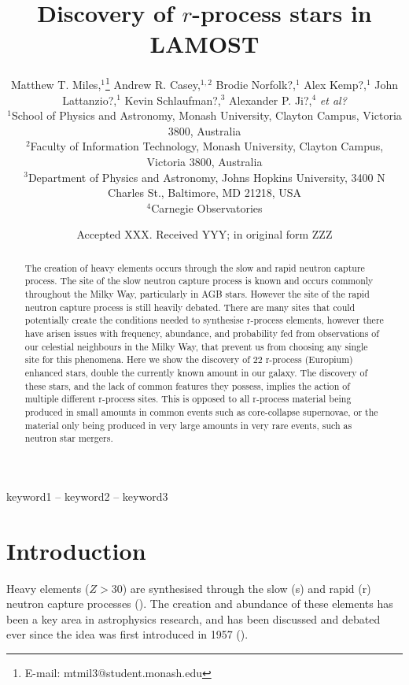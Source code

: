 \documentclass[a4paper,fleqn,usenatbib]{mnras}
\title[Discovery of r-process stars in LAMOST]{Discovery of $r$-process stars in LAMOST}
\author[Matthew T. Miles et al.]{Matthew T. Miles,$^{1}$\thanks{E-mail: mtmil3@student.monash.edu}
Andrew R. Casey,$^{1,2}$
Brodie Norfolk?,$^{1}$
Alex Kemp?,$^{1}$\newauthor
John Lattanzio?,$^{1}$
Kevin Schlaufman?,$^{3}$
Alexander P. Ji?,$^{4}$
\emph{et al?}
\\
$^{1}$School of Physics and Astronomy, Monash University, Clayton Campus, Victoria 3800, Australia\\
$^{2}$Faculty of Information Technology, Monash University, Clayton Campus, Victoria 3800, Australia\\
$^{3}$Department of Physics and Astronomy, Johns Hopkins University, 3400 N Charles St., Baltimore, MD 21218, USA\\
$^{4}$Carnegie Observatories
}
\date{Accepted XXX. Received YYY; in original form ZZZ}
\begin{document}
\label{firstpage}
\pagerange{\pageref{firstpage}--\pageref{lastpage}}
\maketitle

\begin{abstract}
The creation of heavy elements occurs through the slow and rapid neutron capture process. The site of the slow neutron capture process is known and occurs commonly throughout the Milky Way, particularly in AGB stars. However the site of the rapid neutron capture process is still heavily debated. There are many sites that could potentially create the conditions needed to synthesise r-process elements, however there have arisen issues with frequency, abundance, and probability fed from observations of our celestial neighbours in the Milky Way, that prevent us from choosing any single site for this phenomena. Here we show the discovery of 22 r-process (Europium) enhanced stars, double the currently known amount in our galaxy. The discovery of these stars, and the lack of common features they possess, implies the action of multiple different r-process sites. This is opposed to all r-process material being produced in small amounts in common events such as core-collapse supernovae, or the material only being produced in very large amounts in very rare events, such as neutron star mergers. 
\end{abstract}

\begin{keywords}
keyword1 -- keyword2 -- keyword3
\end{keywords}


\section{Introduction}

Heavy elements ($Z > 30$) are synthesised through the slow (s) and rapid (r) neutron capture processes (\cite{Sneden2008}). The creation and abundance of these elements has been a key area in astrophysics research, and has been discussed and debated ever since the idea was first introduced in 1957 (\cite{Burbidge1957}). 
\end{document}
